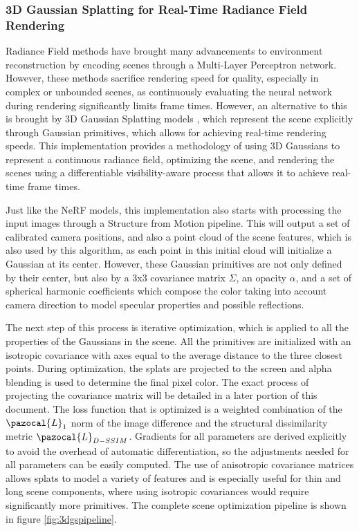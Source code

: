 \subsubsection{3D Gaussian Splatting for Real-Time Radiance Field Rendering}
Radiance Field methods have brought many advancements to environment reconstruction by encoding scenes through a Multi-Layer Perceptron network. However, these methods sacrifice rendering speed for quality, especially in complex or unbounded scenes, as continuously evaluating the neural network during rendering significantly limits frame times. However, an alternative to this is brought by 3D Gaussian Splatting models \cite{kerbl3Dgaussians}, which represent the scene explicitly through Gaussian primitives, which allows for achieving real-time rendering speeds. This implementation provides a methodology of using 3D Gaussians to represent a continuous radiance field, optimizing the scene, and rendering the scenes using a differentiable visibility-aware process that allows it to achieve real-time frame times. 

Just like the NeRF models, this implementation also starts with processing the input images through a Structure from Motion pipeline. This will output a set of calibrated camera positions, and also a point cloud of the scene features, which is also used by this algorithm, as each point in this initial cloud will initialize a Gaussian at its center. However, these Gaussian primitives are not only defined by their center, but also by a 3x3 covariance matrix $\Sigma$, an opacity $\alpha$, and a set of spherical harmonic coefficients which compose the color taking into account camera direction to model specular properties and possible reflections. 

The next step of this process is iterative optimization, which is applied to all the properties of the Gaussians in the scene. All the primitives are initialized with an isotropic covariance with axes equal to the average distance to the three closest points. During optimization, the splats are projected to the screen and alpha blending is used to determine the final pixel color. The exact process of projecting the covariance matrix will be detailed in a later portion of this document. The loss function that is optimized is a weighted combination of the $\pazocal{L}_1$ norm of the image difference and the structural dissimilarity metric $\pazocal{L}_{D-SSIM}$. Gradients for all parameters are derived explicitly to avoid the overhead of automatic differentiation, so the adjustments needed for all parameters can be easily computed. The use of anisotropic covariance matrices allows splats to model a variety of features and is especially useful for thin and long scene components, where using isotropic covariances would require significantly more primitives. The complete scene optimization pipeline is shown in figure \ref{fig:3dgspipeline}.

